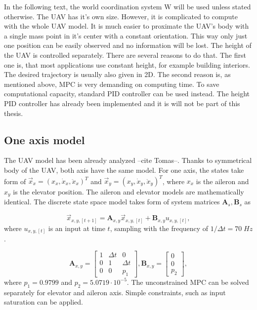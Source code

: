 \documentclass{article}
\begin{document}
In the following text, the world coordination system W will be used unless stated otherwise. 
The UAV has it's own size. However, it is complicated to compute with the whole UAV model. It is much easier to proximate the UAV's body with a single mass point in it's center with a constant orientation. This way only just one position can be easily observed and no information will be lost.  The height of the UAV is controlled separately. There are several reasons to do that. The first one is, that most applications use constant height, for example building interiors. The desired trajectory is usually also given in 2D. The second reason is, as mentioned above, MPC is very demanding on computing time. To save computational capacity, standard PID controller can be used instead. The height PID controller has already been implemented \cite{tomas} and it is will not be part of this thesis. 

\subsection{One axis model}
The UAV model has been already analyzed --cite Tomas--. Thanks to symmetrical body of the UAV, both axis have the same model. For one axis, the states take form of 
$\vec{x}_x = (x_x, \dot{x}_x, \ddot{x}_x)^T$ and $\vec{x}_y = (x_y, \dot{x}_y, \ddot{x}_y)^T$, where $x_x$ is the aileron and $x_y$ is the elevator position. The aileron and elevator models are mathematically identical. The discrete state space model takes form of system matrices $\textbf{A}_s, \textbf{B}_s$ as

\begin{equation}
\label{eq:state_space_model_simple}
\vec{x}_{x,y,[t+1]} = \textbf{A}_{x,y} \vec{x}_{x,y, [t]} +\textbf{B}_{x,y} u_{x,y, [t]},
\end{equation} 
where $u_{x,y,[t]}$ is an input at time $t$, sampling with the frequency of $1/\Delta t = 70\;Hz$.




\begin{equation}
\textbf{A}_{x,y} =
  \begin{bmatrix}
  1 & \Delta t & 		0 \\
  0 & 		 1 & \Delta t \\
  0	& 		 0 &		p_1
  \end{bmatrix},\textbf{B}_{x,y} = \begin{bmatrix}
  0 \\
  0 \\
  p_2
  \end{bmatrix}, 
\end{equation}
where $p_1 = 0.9799$ and $p_2 = 5.0719\cdot10^{-5}$. The unconstrained MPC can be solved separately for elevator and aileron axis. Simple constraints, such as input saturation can be applied.
\end{document}
